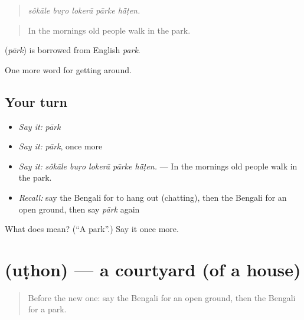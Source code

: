 \begin{quote}
    
\end{quote}

\begin{quote}
\emph{sôkāle buṛo lokerā pārke hā̃ṭen.}
\end{quote}

\begin{quote}
In the mornings old people walk in the park.
\end{quote}

\begin{cousinweb}
\textbf{} (\emph{pārk}) is borrowed from English \emph{park}.
\end{cousinweb}

\begin{grammarlens}[title={What you've built}]
One more word for getting around.
\end{grammarlens}

\subsection*{Your turn}
\begin{itemize}
\raggedright
  \item \emph{Say it:} \emph{pārk}
  \item \emph{Say it:} \emph{pārk}, once more
  \item \emph{Say it:} \emph{sôkāle buṛo lokerā pārke hā̃ṭen.} — In the mornings old people walk in the park.
  \item \emph{Recall:} say the Bengali for to hang out (chatting), then the Bengali for an open ground, then say \emph{pārk} again
\end{itemize}

\begin{tcolorbox}[breakable,colback=teal!4,colframe=teal!35!black,title={Before you move on}]
What does  mean? (\textquotedblleft{}A park\textquotedblright{}.) Say it once more.
\end{tcolorbox}
\section[\texorpdfstring{\bn{উঠোন} (uṭhon)}{উঠোন (uṭhon)}]{ (uṭhon) — a courtyard (of a house)}

\label{lesson:BN-C410-uthon}



\begin{quote}
Before the new one: say the Bengali for an open ground, then the Bengali for a park.
\end{quote}

